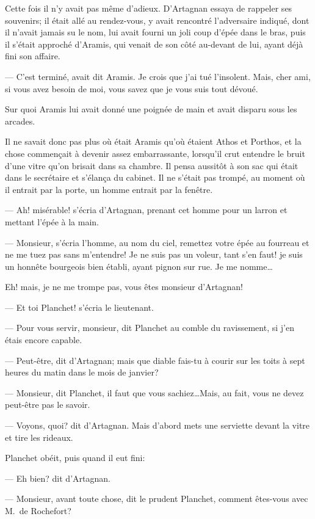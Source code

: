 Cette fois il n'y avait pas même d'adieux. D'Artagnan essaya de rappeler ses souvenirs; il était allé au rendez-vous, y avait rencontré l'adversaire indiqué, dont il n'avait jamais su le nom, lui avait fourni un joli coup d'épée dans le bras, puis il s'était approché d'Aramis, qui venait de son côté au-devant de lui, ayant déjà fini son affaire.

— C'est terminé, avait dit Aramis. Je crois que j'ai tué l'insolent. Mais, cher ami, si vous avez besoin de moi, vous savez que je vous suis tout dévoué.

Sur quoi Aramis lui avait donné une poignée de main et avait disparu sous les arcades.

Il ne savait donc pas plus où était Aramis qu'où étaient Athos et Porthos, et la chose commençait à devenir assez embarrassante, lorsqu'il crut entendre le bruit d'une vitre qu'on brisait dans sa chambre. Il pensa aussitôt à son sac qui était dans le secrétaire et s'élança du cabinet. Il ne s'était pas trompé, au moment où il entrait par la porte, un homme entrait par la fenêtre.

— Ah! misérable! s'écria d'Artagnan, prenant cet homme pour un larron et mettant l'épée à la main.

— Monsieur, s'écria l'homme, au nom du ciel, remettez votre épée au fourreau et ne me tuez pas sans m'entendre! Je ne suis pas un voleur, tant s'en faut! je suis un honnête bourgeois bien établi, ayant pignon sur rue. Je me nomme\dots

Eh! mais, je ne me trompe pas, vous êtes monsieur d'Artagnan!

— Et toi Planchet! s'écria le lieutenant.

— Pour vous servir, monsieur, dit Planchet au comble du ravissement, si j'en étais encore capable.

— Peut-être, dit d'Artagnan; mais que diable fais-tu à courir sur les toits à sept heures du matin dans le mois de janvier?

— Monsieur, dit Planchet, il faut que vous sachiez\dots Mais, au fait, vous ne devez peut-être pas le savoir.

— Voyons, quoi? dit d'Artagnan. Mais d'abord mets une serviette devant la vitre et tire les rideaux.

Planchet obéit, puis quand il eut fini:

— Eh bien? dit d'Artagnan.

— Monsieur, avant toute chose, dit le prudent Planchet, comment êtes-vous avec M.~de Rochefort?

